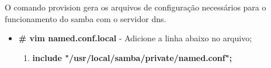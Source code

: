 %       			
%
%
%					

O comando provision gera os arquivos de configuração necessários para o funcionamento do samba com o servidor dns.

\begin{itemize}
	\item \textbf{\# vim named.conf.local} -  Adicione a linha abaixo no arquivo;
		\begin{enumerate}
			\item \textbf{include "/usr/local/samba/private/named.conf";}
		\end{enumerate}
\end{itemize}

